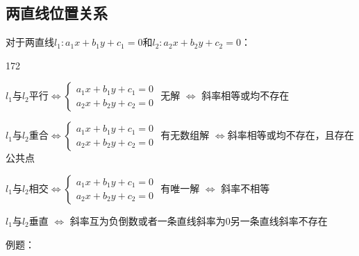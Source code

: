 \subsection*{两直线位置关系}
对于两直线$l_1:a_1 x + b_1y + c_1 = 0$和$l_2:a_2x+b_2y+c_2 = 0$：
\begin{dingautolist}{172}
    \item $l_1$与$l_2$平行$\Longleftrightarrow \left \{ \begin{array}{l}
         a_1 x + b_1y + c_1 = 0  \\
         a_2x + b_2y + c_2 = 0 
    \end{array} \right.$ 无解 $\Longleftrightarrow$ 斜率相等或均不存在
    \item $l_1$与$l_2$重合$\Longleftrightarrow \left \{ \begin{array}{l}
         a_1 x + b_1y + c_1 = 0  \\
         a_2x + b_2y + c_2 = 0 
    \end{array} \right.$ 有无数组解 $\Longleftrightarrow $斜率相等或均不存在，且存在公共点
    \item $l_1$与$l_2$相交$\Longleftrightarrow \left \{ \begin{array}{l}
         a_1 x + b_1y + c_1 = 0  \\
         a_2x + b_2y + c_2 = 0 
    \end{array} \right.$ 有唯一解 $\Longleftrightarrow$ 斜率不相等
    \item $l_1$与$l_2$垂直 $\Longleftrightarrow$ 斜率互为负倒数或者一条直线斜率为0另一条直线斜率不存在
\end{dingautolist}
例题：
